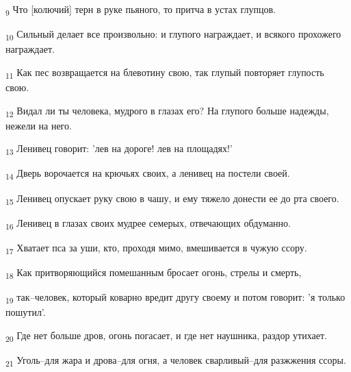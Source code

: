 \begin{tcolorbox}
\textsubscript{9} Что [колючий] терн в руке пьяного, то притча в устах глупцов.
\end{tcolorbox}
\begin{tcolorbox}
\textsubscript{10} Сильный делает все произвольно: и глупого награждает, и всякого прохожего награждает.
\end{tcolorbox}
\begin{tcolorbox}
\textsubscript{11} Как пес возвращается на блевотину свою, так глупый повторяет глупость свою.
\end{tcolorbox}
\begin{tcolorbox}
\textsubscript{12} Видал ли ты человека, мудрого в глазах его? На глупого больше надежды, нежели на него.
\end{tcolorbox}
\begin{tcolorbox}
\textsubscript{13} Ленивец говорит: 'лев на дороге! лев на площадях!'
\end{tcolorbox}
\begin{tcolorbox}
\textsubscript{14} Дверь ворочается на крючьях своих, а ленивец на постели своей.
\end{tcolorbox}
\begin{tcolorbox}
\textsubscript{15} Ленивец опускает руку свою в чашу, и ему тяжело донести ее до рта своего.
\end{tcolorbox}
\begin{tcolorbox}
\textsubscript{16} Ленивец в глазах своих мудрее семерых, отвечающих обдуманно.
\end{tcolorbox}
\begin{tcolorbox}
\textsubscript{17} Хватает пса за уши, кто, проходя мимо, вмешивается в чужую ссору.
\end{tcolorbox}
\begin{tcolorbox}
\textsubscript{18} Как притворяющийся помешанным бросает огонь, стрелы и смерть,
\end{tcolorbox}
\begin{tcolorbox}
\textsubscript{19} так--человек, который коварно вредит другу своему и потом говорит: 'я только пошутил'.
\end{tcolorbox}
\begin{tcolorbox}
\textsubscript{20} Где нет больше дров, огонь погасает, и где нет наушника, раздор утихает.
\end{tcolorbox}
\begin{tcolorbox}
\textsubscript{21} Уголь--для жара и дрова--для огня, а человек сварливый--для разжжения ссоры.
\end{tcolorbox}
